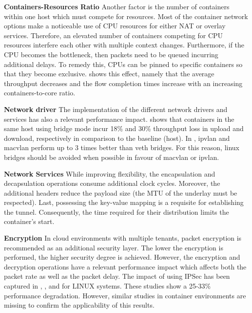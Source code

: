 \documentclass[conference]{IEEEtran}
\begin{document}
\noindent\textbf{Containers-Resources Ratio}\hspace{0.2cm}
Another factor is the number of containers within one host which must compete for resources. Most of the container network options make a noticeable use of CPU resources for either NAT or overlay services. Therefore, an elevated number of containers competing for CPU resources interfere each other with multiple context changes. Furthermore, if the CPU becomes the bottleneck, then packets need to be queued incurring additional delays. To remedy this, CPUs can be pinned to specific containers so that they become exclusive. \cite{Boeira:2021} shows this effect, namely that the average throughput decreases and the flow completion times increase with an increasing containers-to-core ratio. 

\noindent\textbf{Network driver}\hspace{0.2cm}
The implementation of the different network drivers and services has also a relevant performance impact. \cite{IEEE_INFOCOM_2018:K. Suo} shows that containers in the same host using bridge mode incur 18\% and 30\% throughput loss in upload and download, respectively in comparison to the baseline (host). In \cite{NOMS_2016:Claasen}, ipvlan and macvlan perform up to 3 times better than veth bridges. For this reason, linux bridges should be avoided when possible in favour of macvlan or ipvlan.

\noindent\textbf{Network Services}\hspace{0.2cm}
While improving flexibility, the encapsulation and decapsulation operations consume additional clock cycles. Moreover, the additional headers reduce the payload size (the MTU of the underlay must be respected). Last, possessing the key-value mapping is a requisite for establishing the tunnel. Consequently, the time required for their distribution limits the container's start.

\noindent\textbf{Encryption}\hspace{0.2cm}
In cloud environments with multiple tenants, packet encryption is recommended as an additional security layer. The lower the encryption is performed, the higher security degree is achieved. However, the encryption and decryption operations have a relevant performance impact which affects both the packet rate as well as the packet delay. The impact of using IPSec has been captured in \cite{IPsec:2002:Miltchev}, \cite{Ferrante:2005}, and \cite{ICCET:2010} for LINUX systems. These studies show a 25-33\% performance degradation. However, similar studies in container environments are missing to confirm the applicability of this results. 
\end{document}
